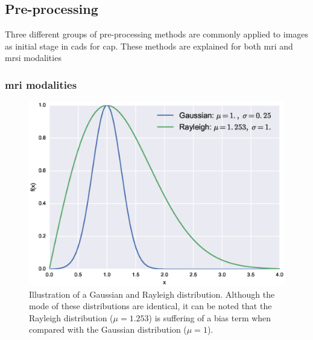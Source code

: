 \subsection{Pre-processing}\label{subsec:chp3img-reg:prepro}
Three different groups of pre-processing methods are commonly applied to images
as initial stage in \acp{cad} for \ac{cap}.
These methods are explained for both \ac{mri} and \ac{mrsi} modalities

\subsubsection{\acs*{mri} modalities}\label{subsubsec:ch3:mriprepro}

\begin{enumerate}[leftmargin=*]

\begin{figure}
  \centering
  \includegraphics[width=0.7\linewidth]{3_review/figures/processing/pre-processing/noise/noisedistr.eps}
  \caption[Illustration of a Gaussian and Rayleigh distributions.]{Illustration
    of a Gaussian and Rayleigh distribution. Although the mode of these
    distributions are identical, it can be noted that the Rayleigh distribution
    ($\mu=1.253$) is suffering of a bias term when compared with the Gaussian
    distribution ($\mu=1$).}
  \label{fig:noisedistr}
\end{figure}


\end{enumerate}
